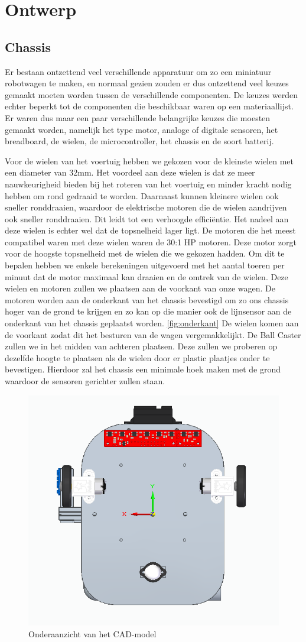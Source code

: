 \documentclass[a4paper,kulak]{kulakarticle}
\begin{document}
\section{Ontwerp}

\subsection{Chassis}
Er bestaan ontzettend veel verschillende apparatuur om zo een miniatuur robotwagen te maken, en normaal gezien zouden er dus ontzettend veel keuzes gemaakt moeten worden tussen de verschillende componenten. De keuzes werden echter beperkt tot de componenten die beschikbaar waren op een materiaallijst. Er waren dus maar een paar verschillende belangrijke keuzes die moesten gemaakt worden, namelijk het type motor, analoge of digitale sensoren, het breadboard, de wielen, de microcontroller, het chassis en de soort batterij. 


Voor de wielen van het voertuig hebben we gekozen voor de kleinste wielen met een diameter van 32mm. Het voordeel aan deze wielen is dat ze meer nauwkeurigheid bieden bij het roteren van het voertuig en minder kracht nodig hebben om rond gedraaid te worden. Daarnaast kunnen kleinere wielen ook sneller ronddraaien, waardoor de elektrische motoren die de wielen aandrijven ook sneller ronddraaien. Dit leidt tot een verhoogde efficiëntie. Het nadeel aan deze wielen is echter wel dat de topsnelheid lager ligt. De motoren die het meest compatibel waren met deze wielen waren de 30:1 HP motoren. Deze motor zorgt voor de hoogste topsnelheid met de wielen die we gekozen hadden. Om dit te bepalen hebben we enkele berekeningen uitgevoerd met het aantal toeren per minuut dat de motor maximaal kan draaien en de omtrek van de wielen. Deze wielen en motoren zullen we plaatsen aan de voorkant van onze wagen. De motoren worden aan de onderkant van het chassis bevestigd om zo ons chassis hoger van de grond te krijgen en zo kan op die manier ook de lijnsensor aan de onderkant van het chassis geplaatst worden. \ref{fig:onderkant} De wielen komen aan de voorkant zodat dit het besturen van de wagen vergemakkelijkt. De Ball Caster zullen we in het midden van achteren plaatsen. Deze zullen we proberen op dezelfde hoogte te plaatsen als de wielen door er plastic plaatjes onder te bevestigen. Hierdoor zal het chassis een minimale hoek maken met de grond waardoor de sensoren gerichter zullen staan. 

\begin{figure}[h]
	\centering
	\includegraphics[width=.5\textwidth] {onderkant}
	\caption{Onderaanzicht van het CAD-model}
	\label{fig:Onderkant}
\end{figure}
\end{document}
